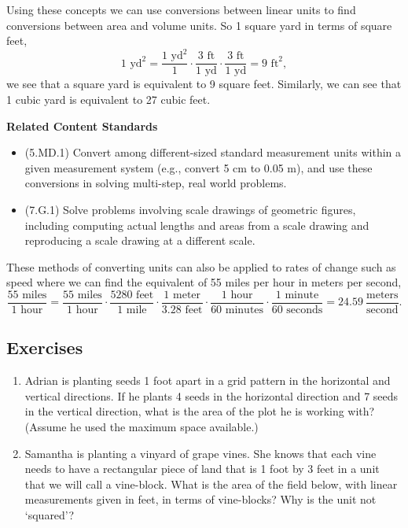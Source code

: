 \documentclass[
]{book}
\providecommand{\tightlist}{%
  \setlength{\itemsep}{0pt}\setlength{\parskip}{0pt}}
\newenvironment{standards}{}{}
\theoremstyle{definition}
\theoremstyle{definition}
\theoremstyle{definition}
\theoremstyle{definition}
\theoremstyle{remark}
\begin{document}
Using these concepts we can use conversions between linear units to find conversions between area and volume units. So 1 square yard in terms of square feet,
\[1 \mbox{ yd}^2 =\frac{1 \mbox{ yd}^2}{1} \cdot \frac{3 \mbox{ ft}}{1 \mbox{ yd}} \cdot \frac{3 \mbox{ ft}}{1 \mbox{ yd}} = 9 \mbox{ ft}^2,\] we see that a square yard is equivalent to 9 square feet.
Similarly, we can see that 1 cubic yard is equivalent to 27 cubic feet.

\begin{standards}

\begin{center}
\textbf{Related Content Standards}

\end{center}

\begin{itemize}
\tightlist
\item
  (5.MD.1) Convert among different-sized standard measurement units within a given measurement system (e.g., convert 5 cm to 0.05 m), and use these conversions in solving multi-step, real world problems.
\item
  (7.G.1) Solve problems involving scale drawings of geometric figures, including computing actual lengths and areas from a scale drawing and reproducing a scale drawing at a different scale.
\end{itemize}

\end{standards}

These methods of converting units can also be applied to rates of change such as speed where we can find the equivalent of 55 miles per hour in meters per second,
\[\frac{55 \mbox{ miles}}{1 \mbox{ hour}} = \frac{55 \mbox{ miles}}{1 \mbox{ hour}} \cdot \frac{5280 \mbox{ feet}}{1 \mbox{ mile}} \cdot \frac{1 \mbox{ meter}}{3.28 \mbox{ feet}} \cdot \frac{1 \mbox{ hour}}{60 \mbox{ minutes}} \cdot \frac{1 \mbox{ minute}}{60 \mbox{ seconds}} = 24.59 \: \frac{\mbox{meters}}{\mbox{second}}.\]

\hypertarget{exercises-44}{%
\subsection{Exercises}\label{exercises-44}}

\begin{enumerate}
\def\labelenumi{\arabic{enumi}.}
\item
  Adrian is planting seeds 1 foot apart in a grid pattern in the horizontal and vertical directions. If he plants 4 seeds in the horizontal direction and 7 seeds in the vertical direction, what is the area of the plot he is working with? (Assume he used the maximum space available.)
\item
  Samantha is planting a vinyard of grape vines. She knows that each vine needs to have a rectangular piece of land that is 1 foot by 3 feet in a unit that we will call a vine-block. What is the area of the field below, with linear measurements given in feet, in terms of vine-blocks? Why is the unit not `squared'?
\end{enumerate}
\end{document}
